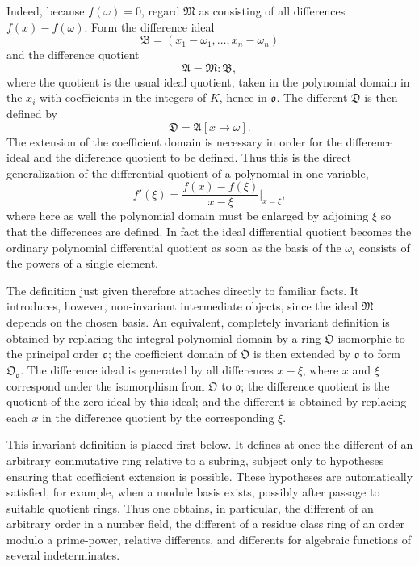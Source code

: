 \documentclass[11pt]{article}
\begin{document}
Indeed, because $f(\omega)=0$, regard $\mathfrak M$ as consisting of all differences $f(x)-f(\omega)$. Form the difference ideal
\[
        \mathfrak B=(x_1-\omega_1,\ldots,x_n-\omega_n)
\]
and the difference quotient
\[
        \mathfrak A=\mathfrak M:\mathfrak B,
\]
where the quotient is the usual ideal quotient, taken in the polynomial domain in the $x_i$ with coefficients in the integers of $K$, hence in $\mathfrak o$. The different $\mathfrak D$ is then defined by
\[
        \mathfrak D=\mathfrak A[x\to\omega].
\]
The extension of the coefficient domain is necessary in order for the difference ideal and the difference quotient to be defined. Thus this is the direct generalization of the differential quotient of a polynomial in one variable,
\[
        f'(\xi)=\frac{f(x)-f(\xi)}{x-\xi}\bigg|_{x=\xi},
\]
where here as well the polynomial domain must be enlarged by adjoining $\xi$ so that the differences are defined. In fact the ideal differential quotient becomes the ordinary polynomial differential quotient as soon as the basis of the $\omega_i$ consists of the powers of a single element.

The definition just given therefore attaches directly to familiar facts. It introduces, however, non-invariant intermediate objects, since the ideal $\mathfrak M$ depends on the chosen basis. An equivalent, completely invariant definition is obtained by replacing the integral polynomial domain by a ring $\mathfrak O$ isomorphic to the principal order $\mathfrak o$; the coefficient domain of $\mathfrak O$ is then extended by $\mathfrak o$ to form $\mathfrak O_{\mathfrak o}$. The difference ideal is generated by all differences $x-\xi$, where $x$ and $\xi$ correspond under the isomorphism from $\mathfrak O$ to $\mathfrak o$; the difference quotient is the quotient of the zero ideal by this ideal; and the different is obtained by replacing each $x$ in the difference quotient by the corresponding $\xi$.

This invariant definition is placed first below. It defines at once the different of an arbitrary commutative ring relative to a subring, subject only to hypotheses ensuring that coefficient extension is possible. These hypotheses are automatically satisfied, for example, when a module basis exists, possibly after passage to suitable quotient rings. Thus one obtains, in particular, the different of an arbitrary order in a number field, the different of a residue class ring of an order modulo a prime-power, relative differents, and differents for algebraic functions of several indeterminates.
\end{document}
